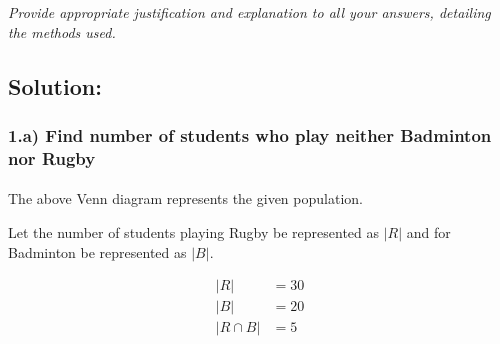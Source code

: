 \documentclass[a4paper]{report}
\begin{document}
\textit{Provide appropriate justification and explanation to all your answers, detailing the methods used.}

\subsection*{Solution:}

\subsubsection*{1.a) Find  number of students who play neither Badminton nor Rugby}

\paragraph{}


\begin{center}
\end{center}


The above Venn diagram represents the given population. 

Let the number of students playing Rugby be represented as $|R|$ and for Badminton be represented as $|B|$.

\begin{align*}
|R|&=30 \\
|B|&=20 \\
|R \cap B|&=5 
\end{align*}
\end{document}
